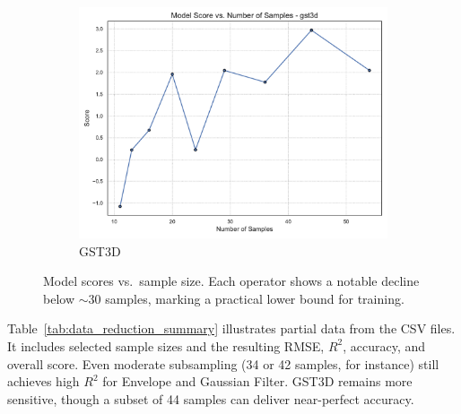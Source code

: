 \begin{figure}[htbp]
\begin{subfigure}[t]{0.32\textwidth}
        \includegraphics[width=\textwidth]{assets/images/05/score_by_sample_size_gst3d}
        \caption{\ac{GST3D}}
    \end{subfigure}
    \caption{Model scores vs.\ sample size.
    Each operator shows a notable decline below \(\sim\)30 samples, marking a practical lower bound for training.}
    \label{fig:score_by_sample_size_operators}
\end{figure}

Table~\ref{tab:data_reduction_summary} illustrates partial data from the CSV files.
It includes selected sample sizes and the resulting \ac{RMSE}, $R^2$, accuracy, and overall score.
Even moderate subsampling (34 or 42 samples, for instance) still achieves high $R^2$ for Envelope and Gaussian Filter.
\ac{GST3D} remains more sensitive, though a subset of 44 samples can deliver near-perfect accuracy.

